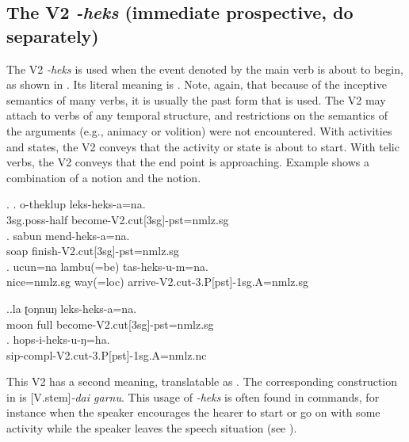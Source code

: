 
\subsection{The V2 \emph{-heks}  (immediate prospective,  do separately)}\label{V2-cut}%

The V2  \emph{-heks}  is used when the event denoted by the main verb is about to begin, as shown in  \Next. Its literal meaning is .  Note, again, that because of the inceptive semantics of many verbs, it is usually the past form that is used. The V2 may attach to verbs of any temporal structure, and restrictions on the semantics of the arguments (e.g., animacy or volition) were not encountered. With activities and states, the V2 conveys that the activity or state is about to start. With telic verbs, the V2 conveys that the end point is approaching. Example \NNext[b] shows a combination of a  notion and the  notion.

\ex. \ag.  o-theklup leks-heks-a=na.\\
	{\sc 3sg.poss-}half become{\sc -V2.cut[3sg]-pst=nmlz.sg}\\
	\bg. sabun mend-heks-a=na.\\
	soap finish{\sc -V2.cut[3sg]-pst=nmlz.sg}\\
	\bg. ucun=na lambu(=be) tas-heks-u-m=na.\\
	nice{\sc =nmlz.sg} way(=loc)  arrive{\sc -V2.cut-3.P[pst]-1sg.A=nmlz.sg}\\

	
\ex.\ag.la ʈoŋnuŋ leks-heks-a=na.\\
	moon full become{\sc -V2.cut[3sg]-pst=nmlz.sg}\\
	\bg. hops-i-heks-u-ŋ=ha.\\
	sip{\sc -compl-V2.cut-3.P[pst]-1sg.A=nmlz.nc}\\
	
	 

This V2 has a second meaning, translatable as . The corresponding construction in  is [{\sc V.stem}]\emph{-dai garnu}. This usage of \emph{-heks} is often found in commands, for instance when the speaker encourages the hearer to start or go on with some activity while the speaker leaves the speech situation (see \Next). 


